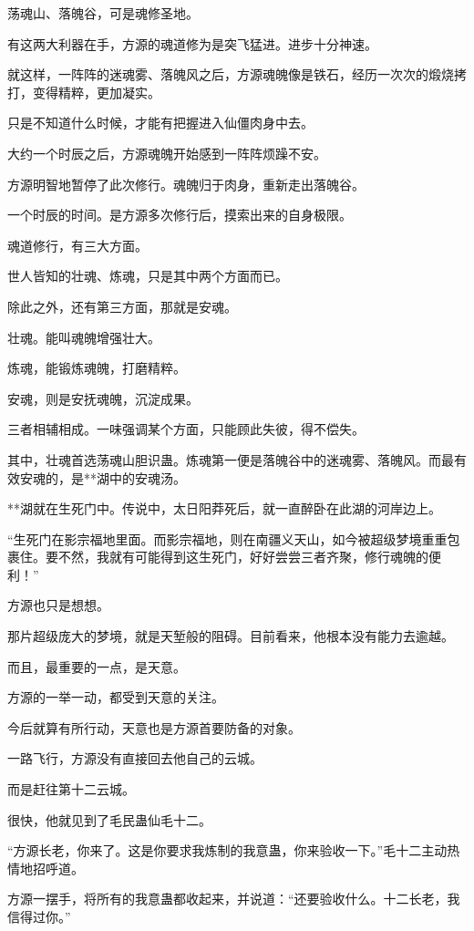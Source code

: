 \begin{this_body}
荡魂山、落魄谷，可是魂修圣地。

有这两大利器在手，方源的魂道修为是突飞猛进。进步十分神速。

就这样，一阵阵的迷魂雾、落魄风之后，方源魂魄像是铁石，经历一次次的煅烧拷打，变得精粹，更加凝实。

只是不知道什么时候，才能有把握进入仙僵肉身中去。

大约一个时辰之后，方源魂魄开始感到一阵阵烦躁不安。

方源明智地暂停了此次修行。魂魄归于肉身，重新走出落魄谷。

一个时辰的时间。是方源多次修行后，摸索出来的自身极限。

魂道修行，有三大方面。

世人皆知的壮魂、炼魂，只是其中两个方面而已。

除此之外，还有第三方面，那就是安魂。

壮魂。能叫魂魄增强壮大。

炼魂，能锻炼魂魄，打磨精粹。

安魂，则是安抚魂魄，沉淀成果。

三者相辅相成。一味强调某个方面，只能顾此失彼，得不偿失。

其中，壮魂首选荡魂山胆识蛊。炼魂第一便是落魄谷中的迷魂雾、落魄风。而最有效安魂的，是**湖中的安魂汤。

**湖就在生死门中。传说中，太日阳莽死后，就一直醉卧在此湖的河岸边上。

“生死门在影宗福地里面。而影宗福地，则在南疆义天山，如今被超级梦境重重包裹住。要不然，我就有可能得到这生死门，好好尝尝三者齐聚，修行魂魄的便利！”

方源也只是想想。

那片超级庞大的梦境，就是天堑般的阻碍。目前看来，他根本没有能力去逾越。

而且，最重要的一点，是天意。

方源的一举一动，都受到天意的关注。

今后就算有所行动，天意也是方源首要防备的对象。

一路飞行，方源没有直接回去他自己的云城。

而是赶往第十二云城。

很快，他就见到了毛民蛊仙毛十二。

“方源长老，你来了。这是你要求我炼制的我意蛊，你来验收一下。”毛十二主动热情地招呼道。

方源一摆手，将所有的我意蛊都收起来，并说道：“还要验收什么。十二长老，我信得过你。”


\end{this_body}
